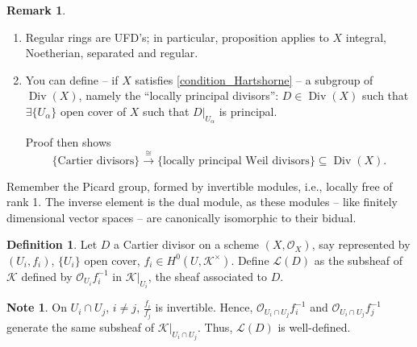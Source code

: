 \documentclass[12pt]{article}
\DeclareMathOperator{\Div}{Div}
\theoremstyle{definition}
\newtheorem*{definition}{Definition}
\newtheorem*{remark}{Remark}
\newtheorem*{note}{Note}
\begin{document}
\begin{remark}
\begin{enumerate}[label=\arabic*)]
\item Regular rings are UFD's; in particular, proposition applies to $X$ integral, Noetherian, separated and regular.

\item You can define -- if $X$ satisfies \eqref{condition_Hartshorne} -- a subgroup of $\Div(X)$, namely the ``locally principal divisors'': $D\in\Div(X)$ such that $\exists\{U_{\alpha}\}$ open cover of $X$ such that $D|_{U_{\alpha}}$ is principal.

Proof then shows
\[\{\text{Cartier divisors}\}\overset{\cong}{\longrightarrow}\{\text{locally principal Weil divisors}\}\subseteq\Div(X).\]
\end{enumerate}
\end{remark}

Remember the Picard group, formed by invertible modules, i.e., locally free of rank 1. The inverse element is the dual module, as these modules -- like finitely dimensional vector spaces -- are canonically isomorphic to their bidual.

\begin{definition}
Let $D$ a Cartier divisor on a scheme $(X,\mathcal{O}_X)$, say represented by $(U_i,f_i)$, $\{U_i\}$ open cover, $f_i\in H^0(U,\mathcal{K}^{\times})$. Define $\mathcal{L}(D)$ as the subsheaf of $\mathcal{K}$ defined by $\mathcal{O}_{U_i}f_i^{-1}$ in $\mathcal{K}|_{U_i}$, the sheaf associated to $D$.
\end{definition}

\begin{note}
On $U_i\cap U_j$, $i\neq j$, $\frac{f_i}{f_j}$ is invertible. Hence, $\mathcal{O}_{U_i\cap U_j}f_i^{-1}$ and $\mathcal{O}_{U_i\cap U_j}f_j^{-1}$ generate the same subsheaf of $\mathcal{K}|_{U_i\cap U_j}$. Thus, $\mathcal{L}(D)$ is well-defined.
\end{note}
\end{document}
